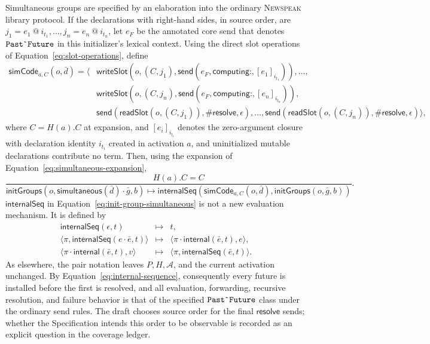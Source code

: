 \documentclass[11pt]{article}
\numberwithin{equation}{section}
\newcommand{\NS}{\textsc{Newspeak}}
\newcommand{\kw}[1]{\ensuremath{\mathsf{#1}}}
\newcommand{\kws}[1]{\ensuremath{\mathsf{#1\mathord{:}}}}
\newcommand{\PastFuture}{\ensuremath{\text{\texttt{Past\textasciigrave Future}}}}
\begin{document}
Simultaneous groups are specified by an elaboration into the ordinary
\NS{} library protocol.  If the declarations with right-hand sides, in source
order, are
$j_1=e_1\ @\ i_{t_1},\ldots,j_n=e_n\ @\ i_{t_n}$, let $e_F$ be the annotated
core send that
denotes \PastFuture{} in this initializer's lexical context.  Using the direct
slot operations of Equation~\eqref{eq:slot-operations}, define
\begin{equation}\label{eq:simultaneous-expansion}
\begin{split}
 \mathsf{simCode}_{a,C}(o,\bar d)=\langle{}
 &\kw{writeSlot}(o,(C,j_1),
      \kw{send}(e_F,\kws{computing},[e_1]_{i_{t_1}})),\ldots,\\
 &\kw{writeSlot}(o,(C,j_n),
      \kw{send}(e_F,\kws{computing},[e_n]_{i_{t_n}})),\\
 &\kw{send}(\kw{readSlot}(o,(C,j_1)),\#\kw{resolve},\epsilon),\ldots,
  \kw{send}(\kw{readSlot}(o,(C,j_n)),\#\kw{resolve},\epsilon)\rangle,
\end{split}
\end{equation}
where $C=H(a).C$ at expansion, and $[e_i]_{i_{t_i}}$ denotes the zero-argument closure with declaration
identity $i_{t_i}$ created in activation $a$, and
uninitialized mutable declarations contribute no term.  Then, using the
expansion of Equation~\eqref{eq:simultaneous-expansion},
\begin{equation}\label{eq:init-group-simultaneous}
 \dfrac{H(a).C=C}{\kw{initGroups}(o,\kw{simultaneous}(\bar d)\cdot\bar g,b)
 \longmapsto
 \kw{internalSeq}(\mathsf{simCode}_{a,C}(o,\bar d),
                  \kw{initGroups}(o,\bar g,b))}.
\end{equation}
$\kw{internalSeq}$ in Equation~\eqref{eq:init-group-simultaneous} is not a new
evaluation mechanism.  It is defined by
\begin{equation}\label{eq:internal-sequence}
\begin{array}{rcl}
 \kw{internalSeq}(\epsilon,t)&\longmapsto&t,\\
 \langle\pi,\kw{internalSeq}(e\cdot\bar e,t)\rangle
   &\longmapsto&
   \langle\pi\cdot\kw{internal}(\bar e,t),e\rangle,\\
 \langle\pi\cdot\kw{internal}(\bar e,t),v\rangle
   &\longmapsto&\langle\pi,\kw{internalSeq}(\bar e,t)\rangle.
\end{array}
\end{equation}
As elsewhere, the pair notation leaves $P,H,\mathcal A$, and the current
activation unchanged.  By Equation~\eqref{eq:internal-sequence}, consequently
every future is installed before the first is resolved, and all
evaluation, forwarding, recursive resolution, and failure behavior is that of
the specified \PastFuture{} class under the ordinary send rules.  The draft
chooses source order for the final \kw{resolve} sends; whether the Specification
intends this order to be observable is recorded as an explicit question in the
coverage ledger.
\end{document}
